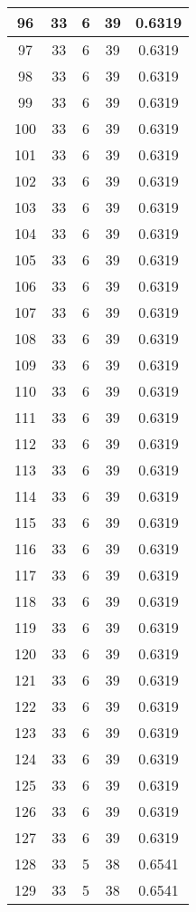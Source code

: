 \documentclass[letterpaper, 12pt]{article}
\begin{document}
\begin{longtable}{|c|c|c|c|c|}
\hline
96 & 33 & 6 & 39 & 0.6319 \\
\hline
97 & 33 & 6 & 39 & 0.6319 \\
\hline
98 & 33 & 6 & 39 & 0.6319 \\
\hline
99 & 33 & 6 & 39 & 0.6319 \\
\hline
100 & 33 & 6 & 39 & 0.6319 \\
\hline
101 & 33 & 6 & 39 & 0.6319 \\
\hline
102 & 33 & 6 & 39 & 0.6319 \\
\hline
103 & 33 & 6 & 39 & 0.6319 \\
\hline
104 & 33 & 6 & 39 & 0.6319 \\
\hline
105 & 33 & 6 & 39 & 0.6319 \\
\hline
106 & 33 & 6 & 39 & 0.6319 \\
\hline
107 & 33 & 6 & 39 & 0.6319 \\
\hline
108 & 33 & 6 & 39 & 0.6319 \\
\hline
109 & 33 & 6 & 39 & 0.6319 \\
\hline
110 & 33 & 6 & 39 & 0.6319 \\
\hline
111 & 33 & 6 & 39 & 0.6319 \\
\hline
112 & 33 & 6 & 39 & 0.6319 \\
\hline
113 & 33 & 6 & 39 & 0.6319 \\
\hline
114 & 33 & 6 & 39 & 0.6319 \\
\hline
115 & 33 & 6 & 39 & 0.6319 \\
\hline
116 & 33 & 6 & 39 & 0.6319 \\
\hline
117 & 33 & 6 & 39 & 0.6319 \\
\hline
118 & 33 & 6 & 39 & 0.6319 \\
\hline
119 & 33 & 6 & 39 & 0.6319 \\
\hline
120 & 33 & 6 & 39 & 0.6319 \\
\hline
121 & 33 & 6 & 39 & 0.6319 \\
\hline
122 & 33 & 6 & 39 & 0.6319 \\
\hline
123 & 33 & 6 & 39 & 0.6319 \\
\hline
124 & 33 & 6 & 39 & 0.6319 \\
\hline
125 & 33 & 6 & 39 & 0.6319 \\
\hline
126 & 33 & 6 & 39 & 0.6319 \\
\hline
127 & 33 & 6 & 39 & 0.6319 \\
\hline
128 & 33 & 5 & 38 & 0.6541 \\
\hline
129 & 33 & 5 & 38 & 0.6541 \\

\end{longtable}
\end{document}
